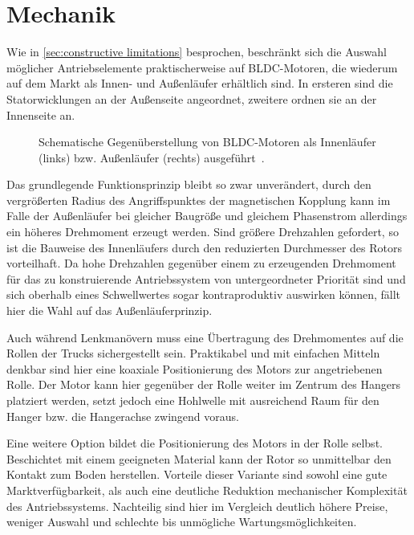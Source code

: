 \chapter{Mechanik}
%
%
%
	Wie in \cref{sec:constructive limitations} besprochen, beschränkt sich die Auswahl möglicher Antriebselemente praktischerweise auf BLDC-Motoren, die wiederum auf dem Markt als Innen- und Außenläufer erhältlich sind.
	In ersteren sind die Statorwicklungen an der Außenseite angeordnet, zweitere ordnen sie an der Innenseite an.
	\begin{figure}[h]
		\centering
		
		\caption[Gegenüberstellung von Innenläufer und Außenläufer]{Schematische Gegenüberstellung von BLDC-Motoren als Innenläufer (links) bzw. Außenläufer (rechts) ausgeführt~\cite{inrunner.outrunner.2022}.}%
		\label{fig:inrunner outrunner}
	\end{figure}
	Das grundlegende Funktionsprinzip bleibt so zwar unverändert, durch den vergrößerten Radius des Angriffspunktes der magnetischen Kopplung kann im Falle der Außenläufer bei gleicher Baugröße und gleichem Phasenstrom allerdings ein höheres Drehmoment erzeugt werden.
	Sind größere Drehzahlen gefordert, so ist die Bauweise des Innenläufers durch den reduzierten Durchmesser des Rotors vorteilhaft.
	Da hohe Drehzahlen gegenüber einem zu erzeugenden Drehmoment für das zu konstruierende Antriebssystem von untergeordneter Priorität sind und sich oberhalb eines Schwellwertes sogar kontraproduktiv auswirken können, fällt hier die Wahl auf das Außenläuferprinzip.\par\medskip
	Auch während Lenkmanövern muss eine Übertragung des Drehmomentes auf die Rollen der Trucks sichergestellt sein.
	Praktikabel und mit einfachen Mitteln denkbar sind hier eine koaxiale Positionierung des Motors zur angetriebenen Rolle.
	Der Motor kann hier gegenüber der Rolle weiter im Zentrum des Hangers platziert werden, setzt jedoch eine Hohlwelle mit ausreichend Raum für den Hanger bzw. die Hangerachse zwingend voraus.

	Eine weitere Option bildet die Positionierung des Motors in der Rolle selbst.
	Beschichtet mit einem geeigneten Material kann der Rotor so unmittelbar den Kontakt zum Boden herstellen.
	Vorteile dieser Variante sind sowohl eine gute Marktverfügbarkeit, als auch eine deutliche Reduktion mechanischer Komplexität des Antriebssystems.
	Nachteilig sind hier im Vergleich deutlich höhere Preise, weniger Auswahl und schlechte bis unmögliche Wartungsmöglichkeiten.

